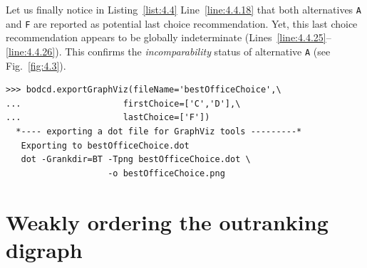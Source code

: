 Let us finally notice in Listing~\vref{list:4.4} Line~\ref{line:4.4.18} that both alternatives \texttt{A} and \texttt{F} are reported as potential last choice recommendation. Yet, this last choice recommendation appears to be globally indeterminate (Lines~\ref{line:4.4.25}--\ref{line:4.4.26}). This confirms the \emph{incomparability} status of alternative \texttt{A} (see Fig.~\vref{fig:4.3}).
\begin{lstlisting}
>>> bodcd.exportGraphViz(fileName='bestOfficeChoice',\
...                    firstChoice=['C','D'],\
...                    lastChoice=['F'])
  *---- exporting a dot file for GraphViz tools ---------*
   Exporting to bestOfficeChoice.dot
   dot -Grankdir=BT -Tpng bestOfficeChoice.dot \
                    -o bestOfficeChoice.png
\end{lstlisting}

\section{Weakly ordering the outranking digraph}
\label{sec:4.6}

